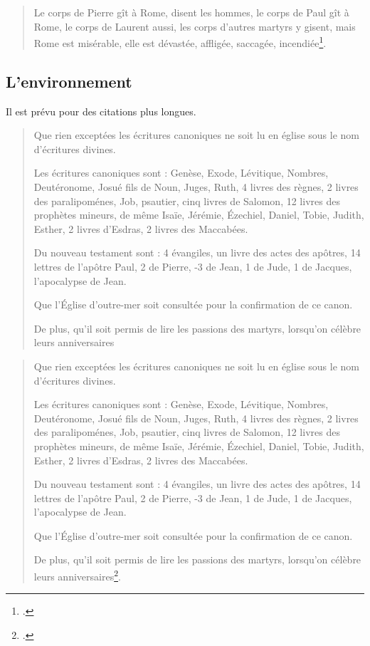 	\begin{quote}
	Le corps de Pierre gît à Rome, disent les hommes, le corps de Paul gît à Rome, le corps de Laurent aussi, les corps d'autres martyrs y gisent, mais Rome est misérable, elle est dévastée, affligée, saccagée, incendiée\footcite[6]{AugustinSermo296}.
	\end{quote}

\subsection{L'environnement }

Il est prévu pour des citations plus longues.

\begin{latexcode}
\begin{quotation}
Que rien exceptées les écritures canoniques ne soit lu en église sous le nom d’écritures divines.

Les écritures canoniques sont : Genèse, Exode, Lévitique, Nombres, Deutéronome,
Josué fils de Noun, Juges, Ruth, 4 livres des règnes, 2 livres des paralipoménes,
Job, psautier, cinq livres de Salomon, 12 livres des prophètes mineurs,
de même Isaïe, Jérémie, Ézechiel, Daniel,
Tobie, Judith, Esther,
2 livres d’Esdras, 2 livres des Maccabées.

Du nouveau testament sont :
4 évangiles, un livre des actes des apôtres,
14 lettres de l’apôtre Paul, 2 de Pierre,
-3 de Jean, 1 de Jude, 1 de Jacques,
l’apocalypse de Jean.

Que l’Église d'outre-mer soit consultée pour la confirmation de ce canon.

De plus, qu'il soit permis de lire les passions des martyrs,
lorsqu'on célèbre leurs anniversaires
\end{quotation}
\end{latexcode}

	\begin{quotation}
Que rien exceptées les écritures canoniques ne soit lu en église sous le nom d’écritures divines.

Les écritures canoniques sont : Genèse, Exode, Lévitique, Nombres, Deutéronome,
Josué fils de Noun, Juges, Ruth, 4 livres des règnes, 2 livres des paralipoménes,
Job, psautier, cinq livres de Salomon, 12 livres des prophètes mineurs,
de même Isaïe, Jérémie, Ézechiel, Daniel,
Tobie, Judith, Esther,
2 livres d’Esdras, 2 livres des Maccabées.

Du nouveau testament sont :
4 évangiles, un livre des actes des apôtres,
14 lettres de l’apôtre Paul, 2 de Pierre,
-3 de Jean, 1 de Jude, 1 de Jacques,
l’apocalypse de Jean.

Que l’Église d'outre-mer soit consultée pour la confirmation de ce canon.

De plus, qu'il soit permis de lire les passions des martyrs,
lorsqu'on célèbre leurs anniversaires\footcite{BreveHippone}.

	\end{quotation}

